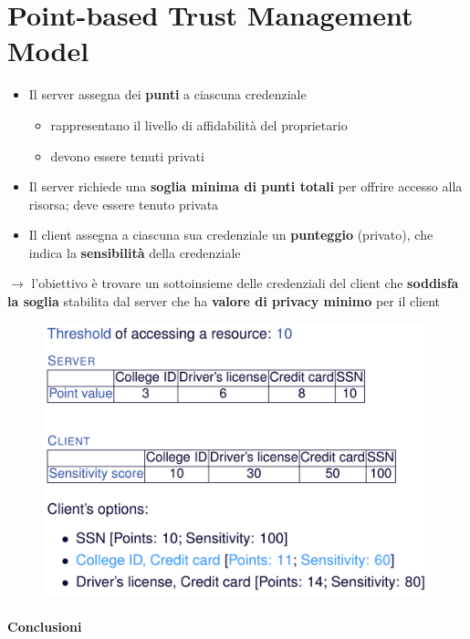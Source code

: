 \documentclass{report}
\begin{document}
\chapter{Point-based Trust Management Model}
\begin{itemize}
    \item Il server assegna dei \textbf{punti} a ciascuna credenziale
    \begin{itemize}
        \item rappresentano il livello di affidabilità del proprietario 
        \item devono essere tenuti privati
    \end{itemize}
    \item Il server richiede una \textbf{soglia minima di punti totali} per offrire accesso alla risorsa; deve essere tenuto privata
    \item Il client assegna a ciascuna sua credenziale un \textbf{punteggio} (privato), che indica la \textbf{sensibilità} della credenziale
\end{itemize}

$\rightarrow$ l'obiettivo è trovare un sottoinsieme delle credenziali del client che \textbf{soddisfa 
la soglia} stabilita dal server che ha \textbf{valore di privacy minimo} per il client

\newpage
\begin{figure}[ht]
    \centering
    \includegraphics[width=0.85\linewidth]{images/point-based.png}
\end{figure}

\subsubsection{Conclusioni}
\end{document}
